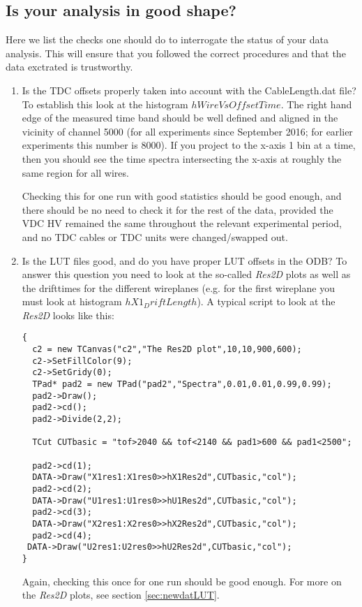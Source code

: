 \documentclass[11pt]{report}
\begin{document}
\subsection{Is your analysis in good shape?}
Here we list the checks one should do to interrogate the status of your data analysis.
This will ensure that you followed the correct procedures and that the data exctrated is trustworthy.

\begin{enumerate}

\item 
Is the TDC offsets properly taken into account with the CableLength.dat file?
To establish this look at the histogram $hWireVsOffsetTime$. The right hand edge of the measured
time band
should be well defined and aligned in the vicinity of 
channel 5000 (for all experiments since September 2016; for
earlier experiments this number is 8000). If you project to the x-axis 1 bin at
a time, then you should see the time spectra intersecting the x-axis at roughly the same
region for all wires.

Checking this for one run with good statistics should be good enough, and there should
be no need to check it for the rest of the data, provided the VDC HV remained the same throughout
the relevant experimental period, and no TDC cables or TDC units were changed/swapped out.

\item 
Is the LUT files good, and do you have proper LUT offsets in the ODB?
To answer this question you need to look at the so-called {\it Res2D} plots as well as the drifttimes for
the different wireplanes (e.g. for the first wireplane you must look at histogram $hX1_DriftLength$).
A typical script to look at the {\it Res2D} looks like this:
\begin{verbatim} 
{
  c2 = new TCanvas("c2","The Res2D plot",10,10,900,600);
  c2->SetFillColor(9);
  c2->SetGridy(0);
  TPad* pad2 = new TPad("pad2","Spectra",0.01,0.01,0.99,0.99);
  pad2->Draw();
  pad2->cd();
  pad2->Divide(2,2);

  TCut CUTbasic = "tof>2040 && tof<2140 && pad1>600 && pad1<2500";

  pad2->cd(1);
  DATA->Draw("X1res1:X1res0>>hX1Res2d",CUTbasic,"col");
  pad2->cd(2);
  DATA->Draw("U1res1:U1res0>>hU1Res2d",CUTbasic,"col");
  pad2->cd(3);
  DATA->Draw("X2res1:X2res0>>hX2Res2d",CUTbasic,"col");
  pad2->cd(4);
 DATA->Draw("U2res1:U2res0>>hU2Res2d",CUTbasic,"col");
}
\end{verbatim}
Again, checking this once for one run should be good enough.
For more on the {\it Res2D} plots, see section \ref{sec:newdatLUT}.


\end{enumerate}
\end{document}
